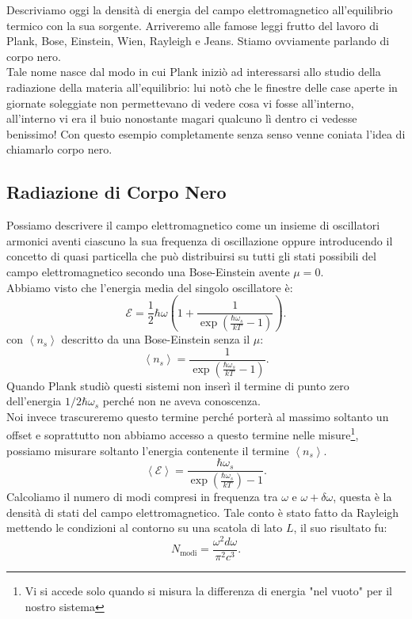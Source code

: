 Descriviamo oggi la densità di energia del campo elettromagnetico all'equilibrio termico con la sua sorgente. Arriveremo alle famose leggi frutto del lavoro di Plank, Bose, Einstein, Wien, Rayleigh e Jeans. Stiamo ovviamente parlando di corpo nero.\\
Tale nome nasce dal modo in cui Plank iniziò ad interessarsi allo studio della radiazione della materia all'equilibrio: lui notò che le finestre delle case aperte in giornate soleggiate non permettevano di vedere cosa vi fosse all'interno, all'interno vi era il buio nonostante magari qualcuno lì dentro ci vedesse benissimo! Con questo esempio completamente senza senso venne coniata l'idea di chiamarlo corpo nero.
\subsection{Radiazione di Corpo Nero}%
Possiamo descrivere il campo elettromagnetico come un insieme di oscillatori armonici aventi ciascuno la sua frequenza di oscillazione oppure introducendo il concetto di quasi particella che può distribuirsi su tutti gli stati possibili del campo elettromagnetico secondo una Bose-Einstein avente $\mu = 0$. \\
Abbiamo visto che l'energia media del singolo oscillatore è:
\[
	\mathcal{E} = \frac{1}{2}\hbar\omega 
	\left( 1 + \frac{1}{\exp\left( \frac{\hbar \omega _{s}}{kT}-1 \right)} \right) 
.\] 
con $\left< n_{s} \right>$ descritto da una Bose-Einstein senza il $\mu $: \[
	\left<n_{s} \right> = \frac{1}{\exp\left( \frac{\hbar \omega _{s}}{kT}-1 \right) }
.\] 
Quando Plank studiò questi sistemi non inserì il termine di punto zero dell'energia $1 /2 \hbar\omega _{s}$  perché non ne aveva conoscenza. \\
Noi invece trascureremo questo termine perché porterà al massimo soltanto un offset e soprattutto non abbiamo accesso a questo termine nelle misure\footnote{Vi si accede solo quando si misura la differenza di energia "nel vuoto" per il nostro sistema}, possiamo misurare soltanto l'energia contenente il termine $\left<n_{s} \right>$.
\[
	\left<\mathcal{E}  \right> = \frac{\hbar \omega _{s}}{\exp\left( \frac{\hbar \omega _{s}}{kT} \right) -1}
.\] 
Calcoliamo il numero di modi compresi in frequenza tra $\omega $ e $\omega + \delta \omega $, questa è la densità di stati del campo elettromagnetico. Tale conto è stato fatto da Rayleigh mettendo le condizioni al contorno su una scatola di lato $L$, il suo risultato fu: 
\[
	N_{\text{modi}}=\frac{\omega ^2 d\omega }{\pi^2 c^3} \label{eq:densita-stati}
.\] 
